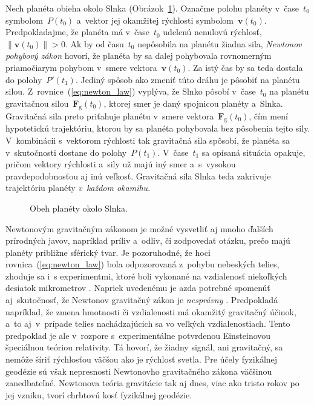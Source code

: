 \documentclass[a4paper,12pt]{book}
\newcommand{\gidx}{\mathrm g}
\let\vec\mathbf
\begin{document}
Nech planéta obieha okolo Slnka (Obrázok~\ref{fig:orbital_motion}).  Označme 
polohu planéty v~čase~$t_0$ symbolom~$P(t_0)$ a~vektor jej okamžitej rýchlosti 
symbolom~$\vec v(t_0)$.  Predpokladajme, že planéta má v~čase~$t_0$ udelenú 
nenulovú rýchlosť, $\| \vec v(t_0) \| > 0$.  Ak by od času~$t_0$ nepôsobila na 
planétu žiadna sila, \emph{Newtonov pohybový zákon} hovorí, že planéta by sa 
ďalej pohybovala rovnomerným priamočiarym pohybom v~smere vektora~$\vec 
v(t_0)$.  Za istý čas by sa teda dostala do polohy~$P'(t_1)$.  Jediný spôsob 
ako zmeniť túto dráhu je pôsobiť na planétu silou.  
Z~rovnice~(\ref{eq:newton_law}) vyplýva, že Slnko pôsobí v~čase~$t_0$ na 
planétu gravitačnou silou~$\vec F_\gidx(t_0)$, ktorej smer je daný spojnicou 
planéty a~Slnka.  Gravitačná sila preto priťahuje planétu v~smere vektora~$\vec 
F_\gidx(t_0)$, čím mení hypotetickú trajektóriu, ktorou by sa planéta 
pohybovala bez pôsobenia tejto sily.  V~kombinácii s~vektorom rýchlosti tak 
gravitačná sila spôsobí, že planéta sa v~skutočnosti dostane do 
polohy~$P(t_1)$.  V~čase~$t_1$ sa opísaná situácia opakuje, pričom vektory 
rýchlosti a~sily už majú iný smer a~s~vysokou pravdepodobnosťou aj inú veľkosť.  
Gravitačná sila Slnka teda zakrivuje trajektóriu planéty \emph{v~každom 
okamihu}.

\begin{figure}
\centering

\caption{Obeh planéty okolo Slnka.}
\label{fig:orbital_motion}
\end{figure}

Newtonovým gravitačným zákonom je možné vysvetliť aj mnoho ďalších prírodných 
javov, napríklad príliv a~odliv, či zodpovedať otázku, prečo majú planéty 
približne sférický tvar.  Je pozoruhodné, že hoci rovnica~(\ref{eq:newton_law}) 
bola odpozorovaná z~pohybu nebeských telies, zhoduje sa i~s experimentmi, ktoré 
boli vykonané na vzdialenosť niekoľkých desiatok mikrometrov 
\parencite{Lee2020}.  Napriek uvedenému je azda potrebné spomenúť 
aj~skutočnosť, že Newtonov gravitačný zákon je \emph{nesprávny} 
\parencite{Feynman}.  Predpokladá napríklad, že zmena hmotnosti či vzdialenosti 
má okamžitý gravitačný účinok, a~to aj~v~prípade telies nachádzajúcich sa vo 
veľkých vzdialenostiach.  Tento predpoklad je ale v~rozpore s~experimentálne 
potvrdenou Einsteinovou špeciálnou teóriou relativity.  Tá hovorí, že žiadny 
signál, ani gravitačný, sa nemôže šíriť rýchlosťou väčšou ako je rýchlosť 
svetla.  Pre účely fyzikálnej geodézie sú však nepresnosti Newtonovho 
gravitačného zákona väčšinou zanedbateľné.  Newtonova teória gravitácie tak aj 
dnes, viac ako tristo rokov po jej vzniku, tvorí chrbtovú kosť fyzikálnej 
geodézie.
\end{document}
